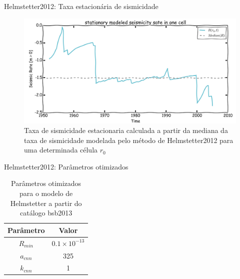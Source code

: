\documentclass[ucs,8pt]{beamer}
\begin{document}
\begin{frame}{Helmstetter2012: Taxa estacionária de sismicidade}
\begin{figure}[H]
  \centering
  \includegraphics[width=.90\textwidth]{helmstetter_stationary_a} 
  \caption{Taxa de sismicidade estacionaria calculada a partir da mediana da
  taxa de sismicidade modelada pelo método de Helmstetter2012 para uma determinada célula $r_0$}
  \label{fig:h_stationary} 
\end{figure}
\end{frame}



\begin{frame}{Helmstetter2012: Parâmetros otimizados}
\begin{table}[H]
	\centering
	\begin{tabular}{c|c}
		Parâmetro & Valor \\ \hline
		$R_{min}$ & $0.1\times10^{-13}$ \\
		$a_{cnn}$ & 325 \\
		$k_{cnn}$ & 1 \\
	\end{tabular}
	\caption{Parâmetros otimizados para o modelo de Helmstetter a partir do catálogo \gls{bsb2013}}
	\label{tab:hemlstetter}
\end{table}
\end{frame}
\end{document}
